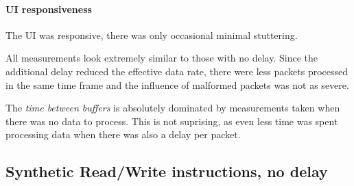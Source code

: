 \paragraph{UI responsiveness}

The UI was responsive, there was only occasional minimal stuttering.
\bigbreak

All measurements look extremely similar to those with no delay. Since the additional delay reduced
the effective data rate, there were less packets processed in the same time frame and the influence
of malformed packets was not as severe.

The \textit{time between buffers} is absolutely dominated by measurements taken when there was no
data to process. This is not suprising, as even less time was spent processing data when there was
also a delay per packet.

\subsection{Synthetic Read/Write instructions, no delay}
\label{evaluation/results/synthetic-read-write-instructions-no-delay}


